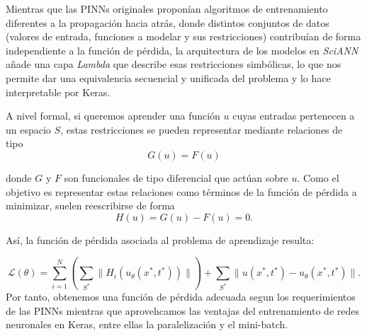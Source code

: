 Mientras que las PINNs originales proponían algoritmos de entrenamiento diferentes a la propagación hacia atrás, donde distintos conjuntos de datos (valores de entrada, funciones a modelar y sus restricciones) contribuían de forma independiente a la función de pérdida, la arquitectura de los modelos en \textit{SciANN} añade una capa \textit{Lambda} que describe esas restricciones simbólicas, lo que nos permite dar una equivalencia secuencial y unificada del problema y lo hace interpretable por Keras. 

A nivel formal, si queremos aprender una función $u$ cuyas entradas pertenecen a un espacio $S$, estas restricciones se pueden representar mediante relaciones de tipo 
\begin{equation}
    G(u) = F(u) 
\end{equation}

donde $G$ y $F$ son funcionales de tipo diferencial que actúan sobre $u$. Como el objetivo es representar estas relaciones como términos de la función de pérdida a minimizar, suelen reescribirse de forma
\begin{equation}
    H(u) = G(u) - F(u) = 0.
\end{equation}

Así, la función de pérdida asociada al problema de aprendizaje resulta:

\begin{equation}
    \mathcal{L}(\theta) = \sum_{i=1}^N (\sum_{S^*} \parallel H_i(u_{\theta}(x^*,t^*))\parallel) + \sum_{S^*} \parallel u(x^*,t^*) - u_{\theta}(x^*,t^*) \parallel .
\end{equation}
Por tanto, obtenemos una función de pérdida adecuada segun los requerimientos de las PINNs mientras que aprovehcamos las ventajas del entrenamiento de redes neuronales en Keras, entre ellas la paralelización y el mini-batch.




